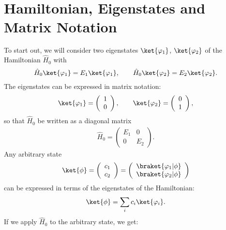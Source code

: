 \section{Hamiltonian, Eigenstates and Matrix Notation}

To start out, we will consider two eigenstates $\ket{\varphi_1}$, $\ket{\varphi_2}$ of the Hamiltonian $\hat{H}_0$ with
\begin{align}
 \hat{H}_0\ket{\varphi_1}=E_1\ket{\varphi_1}, \qquad \hat{H}_0\ket{\varphi_2}=E_2\ket{\varphi_2}.
\end{align}
The eigenstates can be expressed in matrix notation:
\begin{align}
\ket{\varphi_1}=\left( \begin{array}{c} 1 \\ 0 \end{array} \right), \qquad \ket{\varphi_2}=\left( \begin{array}{c} 0 \\ 1 \end{array} \right),
			\end{align}
			so that $\hat{H}_0$ be written as a diagonal matrix
			\begin{align}
				\hat{H}_0 = \left(\begin{array}{cc} E_1 & 0 \\ 0 & E_2 \end{array}\right).
			\end{align}
Any arbitrary state 
			\begin{align}
				\ket{\phi} = \left( \begin{array}{c} c_1 \\ c_2 \end{array} \right) = \left( \begin{array}{c} \braket{\varphi_1|\phi} \\ \braket{\varphi_2|\phi} \end{array} \right)
			\end{align}
			can be expressed in terms of the eigenstates of the Hamiltonian:
			\begin{align}
				\ket{\phi} = \sum_i c_i \ket{\varphi_i}.
			\end{align}
			If we apply $\hat{H}_0$ to the arbitrary state, we get:

